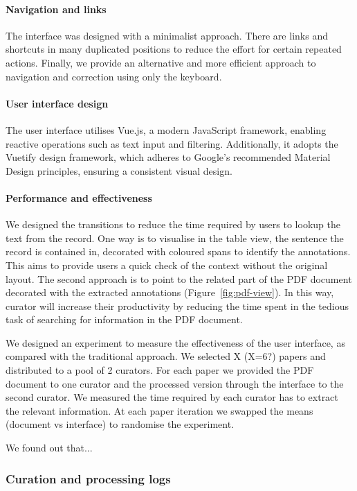 \documentclass[a4paper]{article}
\begin{document}
\paragraph{Navigation and links} The interface was designed with a minimalist approach. 
There are links and shortcuts in many duplicated positions to reduce the effort for certain repeated actions.
Finally, we provide an alternative and more efficient approach to navigation and correction using only the keyboard. 

\paragraph{User interface design}
The user interface utilises Vue.js, a modern JavaScript framework, enabling reactive operations such as text input and filtering. Additionally, it adopts the Vuetify design framework, which adheres to Google's recommended Material Design principles, ensuring a consistent visual design.

\paragraph{Performance and effectiveness}
We designed the transitions to reduce the time required by users to lookup the text from the record. 
One way is to visualise in the table view, the sentence the record is contained in, decorated with coloured spans to identify the annotations. This aims to provide users a quick check of the context without the original layout. 
The second approach is to point to the related part of the PDF document decorated with the extracted annotations (Figure~\ref{fig:pdf-view}). In this way, curator will increase their productivity by reducing the time spent in the tedious task of searching for information in the PDF document. 
 
We designed an experiment to measure the effectiveness of the user interface, as compared with the traditional approach. 
We selected X (X=6?) papers and distributed to a pool of 2 curators. For each paper we provided the PDF document to one curator and the processed version through the interface to the second curator. We measured the time required by each curator has to extract the relevant information. 
At each paper iteration we swapped the means (document vs interface) to randomise the experiment. 

We found out that... 


\subsubsection{Curation and processing logs}
\end{document}

